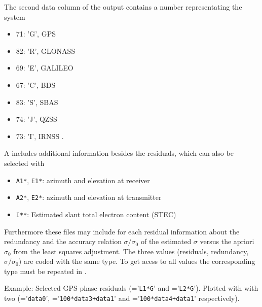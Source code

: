 The second data column of the output contains a number representating the system
\begin{itemize}
\item 71: 'G', GPS
\item 82: 'R', GLONASS
\item 69: 'E', GALILEO
\item 67: 'C', BDS
\item 83: 'S', SBAS
\item 74: 'J', QZSS
\item 73: 'I', IRNSS .
\end{itemize}

A  includes additional information
besides the residuals, which can also be selected with 
\begin{itemize}
\item \verb|A1*|, \verb|E1*|: azimuth and elevation at receiver
\item \verb|A2*|, \verb|E2*|: azimuth and elevation at transmitter
\item \verb|I**|: Estimated slant total electron content (STEC)
\end{itemize}

Furthermore these files may include for each residual 
information about the redundancy and the accuracy relation $\sigma/\sigma_0$
of the estimated $\sigma$ versus the apriori $\sigma_0$ from the least squares adjustment.
The three values (residuals, redundancy, $\sigma/\sigma_0$) are coded with the same type.
To get acess to all values the corresponding type must be repeated in .

Example: Selected GPS phase residuals (='\verb|L1*G|' and ='\verb|L2*G|').
Plotted with  with two 
(='\verb|data0|',  ='\verb|100*data3+data1|' and ='\verb|100*data4+data1|' respectively).


